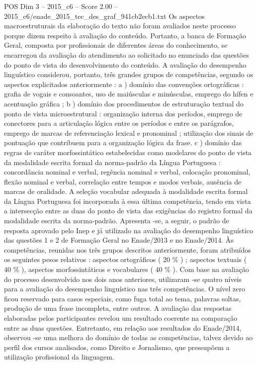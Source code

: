 \begin{textsample}{POS Dim 3 – 2015\_c6 – Score 2.00 – 2015\_c6/enade\_2015\_tec\_des\_graf\_941cb2ecb1.txt}
Os aspectos macroestruturais da elaboração do texto não foram avaliados neste processo porque dizem respeito à avaliação do conteúdo.
Portanto, a banca de Formação Geral, composta por profissionais de diferentes áreas do conhecimento, se encarregou da avaliação do atendimento ao solicitado no enunciado das questões do ponto de vista do desenvolvimento do conteúdo.
A avaliação do desempenho linguístico considerou, portanto, três grandes grupos de competências, segundo os aspectos explicitados anteriormente : a ) domínio das convenções ortográficas : grafia de vogais e consoantes, uso de maiúsculas e minúsculas, emprego do hífen e acentuação gráfica ; b ) domínio dos procedimentos de estruturação textual do ponto de vista microestrutural : organização interna dos períodos, emprego de conectores para a articulação lógica entre os períodos e entre os parágrafos, emprego de marcas de referenciação lexical e pronominal ; utilização dos sinais de pontuação que contribuem para a organização lógica da frase. c ) domínio das regras de caráter morfossintático estabelecidas como modelares do ponto de vista da modalidade escrita formal da norma-padrão da Língua Portuguesa : concordância nominal e verbal, regência nominal e verbal, colocação pronominal, flexão nominal e verbal, correlação entre tempos e modos verbais, ausência de marcas de oralidade.
A seleção vocabular adequada à modalidade escrita formal da Língua Portuguesa foi incorporada à essa última competência, tendo em vista a intersecção entre as duas do ponto de vista das exigências do registro formal da modalidade escrita da norma-padrão.
Apresenta -se, a seguir, o padrão de resposta aprovado pelo Inep e já utilizado na avaliação do desempenho linguístico das questões 1 e 2 de Formação Geral no Enade/2013 e no Enade/2014.
Às competências, reunidas nos três grupos descritos anteriormente, foram atribuídos os seguintes pesos relativos : aspectos ortográficos ( 20 \% ) ; aspectos textuais ( 40 \% ), aspectos morfossintáticos e vocabulares ( 40 \% ).
Com base na avaliação do processo desenvolvido nos dois anos anteriores, utilizaram -se quatro níveis para a avaliação do desempenho linguístico nas três competências.
O nível zero ficou reservado para casos especiais, como fuga total ao tema, palavras soltas, produção de uma frase incompleta, entre outros.
A avaliação das respostas elaboradas pelos participantes revelou um resultado coerente na comparação entre as duas questões.
Entretanto, em relação aos resultados do Enade/2014, observou -se uma melhora do domínio de todas as competências, talvez devido ao perfil dos cursos analisados, como Direito e Jornalismo, que pressupõem a utilização profissional da linguagem.

\end{textsample}
